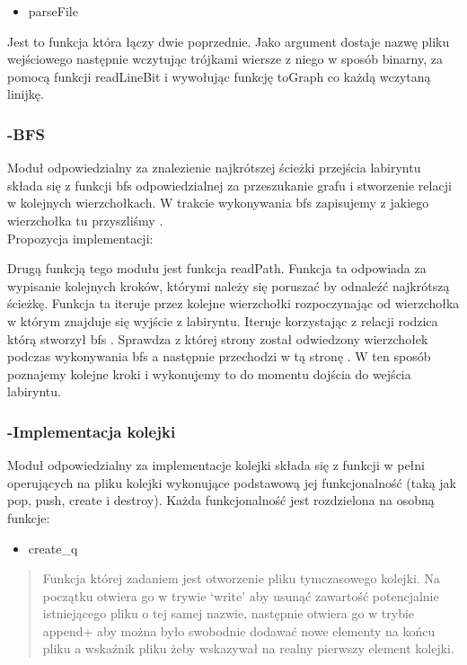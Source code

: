 \documentclass[
]{article}
\begin{document}
\begin{itemize}
\item
  parseFile
\end{itemize}

Jest to funkcja która łączy dwie poprzednie. Jako argument dostaje nazwę
pliku wejściowego następnie wczytując trójkami wiersze z niego w sposób
binarny, za pomocą funkcji readLineBit i wywołując funkcję toGraph co
każdą wczytaną linijkę.

\hypertarget{bfs}{%
\subsubsection{-BFS}\label{bfs}}

Moduł odpowiedzialny za znalezienie najkrótszej ścieżki przejścia
labiryntu\\
składa się z funkcji bfs odpowiedzialnej za przeszukanie grafu i
stworzenie relacji w kolejnych wierzchołkach. W trakcie wykonywania bfs
zapisujemy z jakiego wierzchołka tu przyszliśmy .\\
Propozycja implementacji:

Drugą funkcją tego modułu jest funkcja readPath. Funkcja ta odpowiada za
wypisanie kolejnych kroków, którymi należy się poruszać by odnaleźć
najkrótszą ścieżkę. Funkcja ta iteruje przez kolejne wierzchołki
rozpoczynając od wierzchołka w którym znajduje się wyjście z labiryntu.
Iteruje korzystając z relacji rodzica którą stworzył bfs . Sprawdza z
której strony został odwiedzony wierzchołek podczas wykonywania bfs a
następnie przechodzi w tą stronę . W ten sposób poznajemy kolejne kroki
i wykonujemy to do momentu dojścia do wejścia labiryntu.

\hypertarget{implementacja-kolejki}{%
\subsubsection{-Implementacja kolejki}\label{implementacja-kolejki}}

Moduł odpowiedzialny za implementacje kolejki składa się z funkcji w
pełni operujących na pliku kolejki wykonujące podstawową jej
funkcjonalność (taką jak pop, push, create i destroy). Każda
funkcjonalność jest rozdzielona na osobną funkcje:

\begin{itemize}
\item
  create\_q
\end{itemize}

\begin{quote}
Funkcja której zadaniem jest otworzenie pliku tymczasowego kolejki. Na
początku otwiera go w trywie `write' aby usunąć zawartość potencjalnie
istniejącego pliku o tej samej nazwie, następnie otwiera go w trybie
append+ aby można było swobodnie dodawać nowe elementy na końcu pliku a
wskaźnik pliku żeby wskazywał na realny pierwszy element kolejki.
\end{quote}
\end{document}
